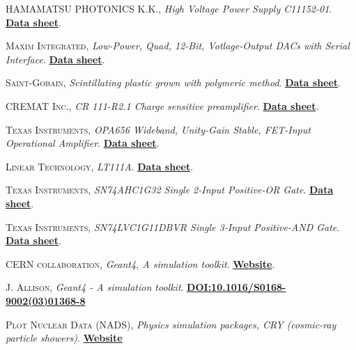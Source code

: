 \begin{thebibliography}{100}
 \textsc{HAMAMATSU PHOTONICS K.K.},
\textit{High Voltage Power Supply C11152-01}. \href{https://www.hamamatsu.com/jp/en/product/type/C11152-01/index.html}{\textbf{Data sheet}}.

 \textsc{Maxim Integrated},
\textit{Low-Power, Quad, 12-Bit, Votlage-Output DACs with Serial Interface}. \href{https://www.maximintegrated.com/en/products/analog/data-converters/digital-to-analog-converters/MAX5500.html}{\textbf{Data sheet}}.

 \textsc{Saint-Gobain},
\textit{Scintillating plastic grown with polymeric method}. \href{https://www.epic-crystal.com/others/plastic-scintillator.html}{\textbf{Data sheet}}.

 \textsc{CREMAT Inc.},
\textit{CR 111-R2.1 Charge sensitive preamplifier}. \href{https://www.cremat.com/home/charge-sensitive-preamplifiers/}{\textbf{Data sheet}}.

 \textsc{Texas Instruments},
\textit{OPA656 Wideband, Unity-Gain Stable, FET-Input Operational Amplifier}. \href{https://www.ti.com/product/OPA656}{\textbf{Data sheet}}.

 \textsc{Linear Technology},
\textit{LT111A}. \href{https://datasheetspdf.com/pdf/57354/LinearTechnology/LT111/1}{\textbf{Data sheet}}.

 \textsc{Texas Instruments},
\textit{SN74AHC1G32 Single 2-Input Positive-OR Gate}. \href{https://www.ti.com/product/SN74AHC1G32}{\textbf{Data sheet}}.

 \textsc{Texas Instruments},
\textit{SN74LVC1G11DBVR Single 3-Input Positive-AND Gate}. \href{https://www.ti.com/store/ti/en/p/product/?p=SN74LVC1G11DBVR}{\textbf{Data sheet}}.

 \textsc{CERN collaboration}, 
\textit{Geant4, A simulation toolkit}. \href{https://geant4.web.cern.ch/node/1}{\textbf{Website}}.

 \textsc{J. Allison}, 
\textit{Geant4 - A simulation toolkit}. \href{https://doi.org/10.1016/S0168-9002(03)01368-8}{\textbf{DOI:10.1016/S0168-9002(03)01368-8}}

 \textsc{Plot Nuclear Data (NADS)}, 
\textit{Physics simulation packages, CRY (cosmic-ray particle showers)}. \href{https://nuclear.llnl.gov/simulation/}{\textbf{Website}}


\end{thebibliography}
